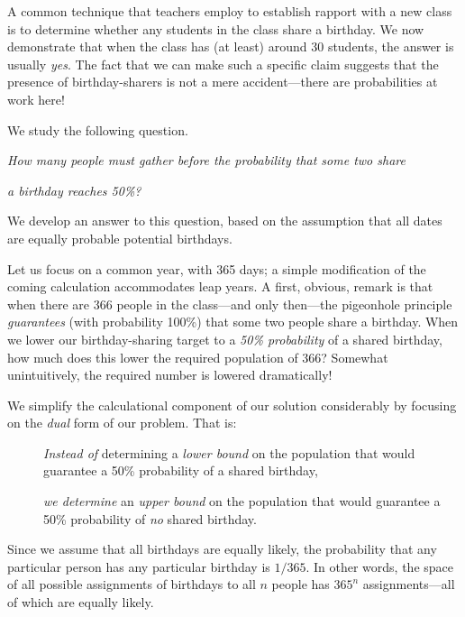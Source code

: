 \bigskip

A common technique that teachers employ to establish rapport with a new class is to determine whether any students in the class share a birthday.  We now demonstrate that when the class has (at least) around 30 students, the answer is usually \textit{yes}.  The fact that we can make such a specific claim suggests that the presence of birthday-sharers is not a mere accident---there are probabilities at work here!

\medskip

\noindent
We study the following question.

\smallskip

{\it How many people must gather before the probability that some two share}

{\it a birthday reaches 50\%?}

\medskip

\noindent
We develop an answer to this question, based on the assumption that all dates are equally probable potential birthdays.

\bigskip

Let us focus on a common year, with 365 days; a simple modification of the coming calculation 
accommodates leap years.  A first, obvious, remark is that when there are 366 people in the 
class---and only then---the pigeonhole principle {\em guarantees} (with probability 100\%)  that some two people share a birthday.  When we lower our birthday-sharing target to a  {\em 50\% probability} of a shared birthday, how much does this lower the required population  of 366?  Somewhat unintuitively, the required number is lowered dramatically!

\bigskip

We simplify the calculational component of our solution considerably by focusing on the  {\em dual} form of our problem.  That is:

\begin{description}
\item[]
{\em Instead of} determining a {\em lower bound} on the population that would guarantee a 50\% probability of a shared birthday,

\medskip\item[]
{\em we determine} an {\em upper bound} on the population that would guarantee a 50\% probability of {\em no} shared birthday.
\end{description}

\smallskip

Since we assume that all birthdays are equally likely, the probability that any particular person has any particular birthday is $1/365$.  In other words, the space of all possible assignments of birthdays to all $n$ people has $365^n$ assignments---all of which are equally likely.

